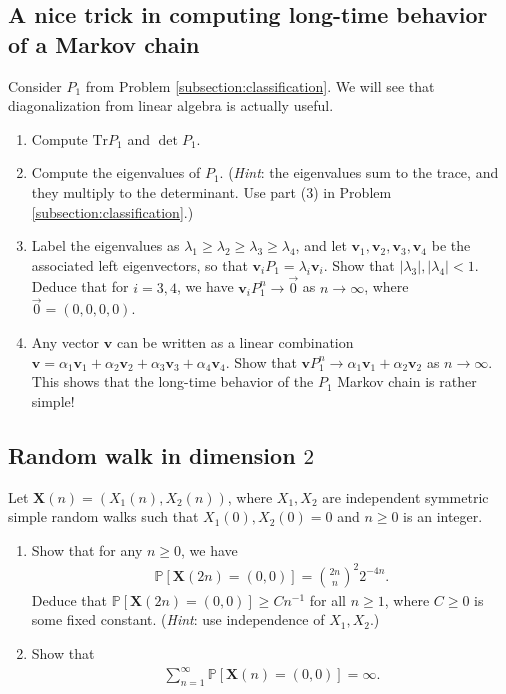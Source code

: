 \documentclass[12pt,reqno]{amsart}
\theoremstyle{definition}
\theoremstyle{remark}
\numberwithin{equation}{section}
\begin{document}
\subsection{A nice trick in computing long-time behavior of a Markov chain}
Consider $P_{1}$ from Problem \ref{subsection:classification}. We will see that diagonalization from linear algebra is actually useful.
\begin{enumerate}
\item Compute $\mathrm{Tr} P_{1}$ and $\det P_{1}$.
\item Compute the eigenvalues of $P_{1}$. (\emph{Hint}: the eigenvalues sum to the trace, and they multiply to the determinant. Use part (3) in Problem \ref{subsection:classification}.) 
\item Label the eigenvalues as $\lambda_{1}\geq\lambda_{2}\geq\lambda_{3}\geq\lambda_{4}$, and let $\mathbf{v}_{1},\mathbf{v}_{2},\mathbf{v}_{3},\mathbf{v}_{4}$ be the associated left eigenvectors, so that $\mathbf{v}_{i}P_{1}=\lambda_{i}\mathbf{v}_{i}$. Show that $|\lambda_{3}|,|\lambda_{4}|<1$. Deduce that for $i=3,4$, we have $\mathbf{v}_{i}P_{1}^{n}\to\vec{0}$ as $n\to\infty$, where $\vec{0}=(0,0,0,0)$.
\item Any vector $\mathbf{v}$ can be written as a linear combination $\mathbf{v}=\alpha_{1}\mathbf{v}_{1}+\alpha_{2}\mathbf{v}_{2}+\alpha_{3}\mathbf{v}_{3}+\alpha_{4}\mathbf{v}_{4}$. Show that $\mathbf{v}P_{1}^{n}\to\alpha_{1}\mathbf{v}_{1}+\alpha_{2}\mathbf{v}_{2}$ as $n\to\infty$. This shows that the long-time behavior of the $P_{1}$ Markov chain is rather simple! 
\end{enumerate}
\subsection{Random walk in dimension $2$}
Let $\mathbf{X}(n)=(X_{1}(n),X_{2}(n))$, where $X_{1},X_{2}$ are independent symmetric simple random walks such that $X_{1}(0),X_{2}(0)=0$ and $n\geq0$ is an integer. 
\begin{enumerate}
\item Show that for any $n\geq0$, we have 
%
\begin{align*}
\mathbb{P}[\mathbf{X}(2n)=(0,0)]=\binom{2n}{n}^{2}2^{-4n}.
\end{align*}
%
Deduce that $\mathbb{P}[\mathbf{X}(2n)=(0,0)]\geq Cn^{-1}$ for all $n\geq1$, where $C\geq0$ is some fixed constant. (\emph{Hint}: use independence of $X_{1},X_{2}$.)
\item Show that 
%
\begin{align*}
\sum_{n=1}^{\infty}\mathbb{P}[\mathbf{X}(n)=(0,0)]=\infty.
\end{align*}
%
\end{enumerate}
\end{document}
